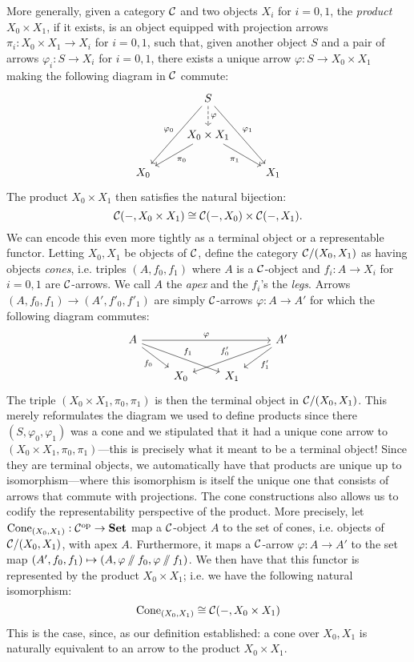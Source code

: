 More generally, given a category $\mathcal{C}$ and two objects $X_i$ for $i=0,1$, the \emph{product} $X_0\times X_1$, if it exists, is an object equipped with projection arrows $\pi_i:X_0\times X_1\to X_i$ for $i=0,1$, such that, given another object $S$ and a pair of arrows $\varphi_i:S\to X_i$ for $i=0,1$, there exists a unique arrow $\varphi:S\to X_0\times X_1$ making the following diagram in $\mathcal{C}$ commute:
\[
\begin{tikzcd}
& S \arrow[d,"\varphi", dashed] \arrow[ddl,"\varphi_{0}"'] \arrow[ddr,"\varphi_{1}"] & \\
& X_0\times X_1 \arrow[dl,"\pi_{0}"] \arrow[dr,"\pi_{1}"'] &\\
X_0 & & X_1
\end{tikzcd}
\]
The product $X_0\times X_1$ then satisfies the natural bijection:
\[\mathcal{C}(-,X_0\times X_1)\cong\mathcal{C}(-,X_0)\times\mathcal{C}(-,X_1).\]
We can encode this even more tightly as a terminal object or a representable functor. Letting $X_0,X_1$ be objects of $\mathcal{C}$, define the category ${\mathcal{C}}/(X_0,X_1)$ as having objects \emph{cones}, i.e. triples $(A,f_0,f_1)$ where $A$ is a $\mathcal{C}$-object and $f_i:A\to X_i$ for $i=0,1$ are $\mathcal{C}$-arrows. We call $A$ the \emph{apex} and the  $f_i$'s the \emph{legs}. Arrows $(A,f_0,f_1)\to (A',f'_0,f'_1)$ are simply $\mathcal{C}$-arrows $\varphi:A\to A'$ for which the following diagram commutes:
\[
\begin{tikzcd}
A \arrow[rrr,"\varphi"] \arrow[dr,"f_0"'] \arrow[drr,"f_1"] &&& A' \arrow[dl,"f'_1"] \arrow[dll,"f'_0"'] \\
& X_0 & X_1 &
\end{tikzcd}
\]
The triple $(X_0\times X_1,\pi_0,\pi_1)$ is then the terminal object in $\mathcal{C}/(X_0,X_1)$. This merely reformulates the diagram we used to define products since there $(S,\varphi_0,\varphi_1)$ was a cone and we stipulated that it had a unique cone arrow to $(X_0\times X_1,\pi_0,\pi_1)$---this is precisely what it meant to be a terminal object! Since they are terminal objects, we automatically have that products are unique up to isomorphism---where this isomorphism is itself the unique one that consists of arrows that commute with projections. The cone constructions also allows us to codify the representability perspective of the product. More precisely, let $\operatorname{Cone}_{(X_0,X_1)}:\mathcal{C}^{\text{op}}\to\mathbf{Set}$ map a $\mathcal{C}$-object $A$ to the set of cones, i.e. objects of $\mathcal{C}/(X_0,X_1)$, with apex $A$. Furthermore, it maps a $\mathcal{C}$-arrow $\varphi:A\to A'$ to the set map $(A',f_0,f_1)\mapsto (A,\varphi\sslash f_0,\varphi\sslash f_1)$. We then have that this functor is represented by the product $X_0\times X_1$; i.e. we have the following natural isomorphism:
\[\operatorname{Cone}_{(X_0,X_1)}\cong \mathcal{C}(-,X_0\times X_1)\]
This is the case, since, as our definition established: a cone over $X_0,X_1$ is naturally equivalent to an arrow to the product $X_0\times X_1$.

